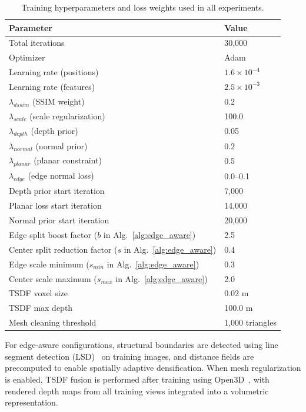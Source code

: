 \begin{table}[h]
\centering
\caption{Training hyperparameters and loss weights used in all experiments.}
\label{tab:hyperparameters}
\begin{tabular}{ll}
\toprule
\textbf{Parameter} & \textbf{Value} \\
\midrule
Total iterations & 30,000 \\
Optimizer & Adam \\
Learning rate (positions) & $1.6 \times 10^{-4}$ \\
Learning rate (features) & $2.5 \times 10^{-3}$ \\
\midrule
$\lambda_{dssim}$ (SSIM weight) & 0.2 \\
$\lambda_{scale}$ (scale regularization) & 100.0 \\
$\lambda_{depth}$ (depth prior) & 0.05 \\
$\lambda_{normal}$ (normal prior) & 0.2 \\
$\lambda_{planar}$ (planar constraint) & 0.5 \\
$\lambda_{edge}$ (edge normal loss) & 0.0--0.1 \\
\midrule
Depth prior start iteration & 7,000 \\
Planar loss start iteration & 14,000 \\
Normal prior start iteration & 20,000 \\
\midrule
Edge split boost factor ($b$ in Alg.~\ref{alg:edge_aware}) & 2.5 \\
Center split reduction factor ($s$ in Alg.~\ref{alg:edge_aware}) & 0.4 \\
Edge scale minimum ($s_{min}$ in Alg.~\ref{alg:edge_aware}) & 0.3 \\
Center scale maximum ($s_{max}$ in Alg.~\ref{alg:edge_aware}) & 2.0 \\
\midrule
TSDF voxel size & 0.02 m \\
TSDF max depth & 100.0 m \\
Mesh cleaning threshold & 1,000 triangles \\
\bottomrule
\end{tabular}
\end{table}

For edge-aware configurations, structural boundaries are detected using line segment detection (LSD)~\cite{vongioi2010lsd} on training images, and distance fields are precomputed to enable spatially adaptive densification. When mesh regularization is enabled, TSDF fusion is performed after training using Open3D~\cite{zhou2018open3d}, with rendered depth maps from all training views integrated into a volumetric representation.

